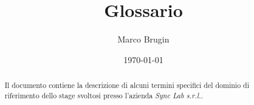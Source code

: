 \documentclass{article}
\title{Glossario}
\author{Marco Brugin}
\date{\today}
\begin{document}
\maketitle
\begin{abstract}
    

Il documento contiene la descrizione di alcuni termini specifici del dominio di riferimento dello stage svoltosi presso l'azienda \textit{Sync Lab s.r.l.}.
\end{abstract}
\clearpage
\tableofcontents
\clearpage
\glsaddall{}
\printglossary[nonumberlist]
\end{document}
